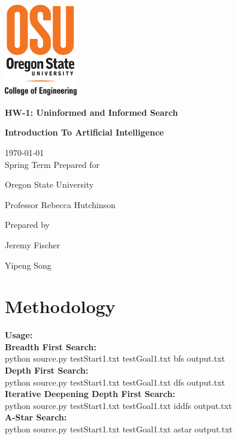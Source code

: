 \documentclass[onecolumn,draftclsnofoot, 10pt, compsoc]{IEEEtran}
\def \GroupNumber{		17}
\def \Jeremy{			Jeremy Fischer}
\def \Roger{			Yipeng Song}
\def \Class{		Introduction To Artificial Intelligence}
\def \Assn{		HW-1: Uninformed and Informed Search}
\def \School{	Oregon State University}
\def \Professor{		Professor Rebecca Hutchinson}
\begin{document}
\begin{titlepage}
    \begin{singlespace}
    	\includegraphics[height=4cm]{coe.eps}
        \hfill  
        \par\vspace{.2in}
        \centering
        \scshape{
            \vspace{.5in}
            \textbf{\Large\Assn}\par
            \textbf{\large\Class}\par
            \large{
            	\today \\Spring Term
        	}
            \vfill
            {\large Prepared for}\par
            \huge \School\par
            \vspace{5pt}
            {\Large{\Professor}\par}
            {\large Prepared by }\par
            \vspace{5pt}
            {\Large
                {\Jeremy}\par
                {\Roger}\par
            }
            \vspace{20pt}
        }

    \end{singlespace}
\end{titlepage}
\newpage
{}

\tableofcontents
\newpage
\clearpage


	\section{Methodology}	
	\noindent \textbf{Usage:} \\
    \textbf{Breadth First Search:} \\python source.py testStart1.txt testGoal1.txt bfs output.txt\\
    \textbf{Depth First Search:} \\python source.py testStart1.txt testGoal1.txt dfs output.txt\\
    \textbf{Iterative Deepening Depth First Search:} \\python source.py testStart1.txt testGoal1.txt iddfs output.txt\\
    \textbf{A-Star Search:} \\python source.py testStart1.txt testGoal1.txt astar output.txt\\
    
\end{document}

